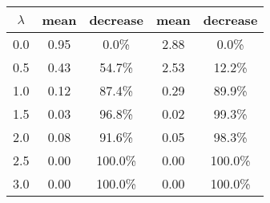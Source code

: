 \begin{tabular}{c||c|c||c|c}
\toprule
 $\lambda$ &  mean & decrease &  mean & decrease \\
\midrule
       0.0 &  0.95 &    0.0\% &  2.88 &    0.0\% \\
       0.5 &  0.43 &   54.7\% &  2.53 &   12.2\% \\
       1.0 &  0.12 &   87.4\% &  0.29 &   89.9\% \\
       1.5 &  0.03 &   96.8\% &  0.02 &   99.3\% \\
       2.0 &  0.08 &   91.6\% &  0.05 &   98.3\% \\
       2.5 &  0.00 &  100.0\% &  0.00 &  100.0\% \\
       3.0 &  0.00 &  100.0\% &  0.00 &  100.0\% \\
\bottomrule
\end{tabular}
